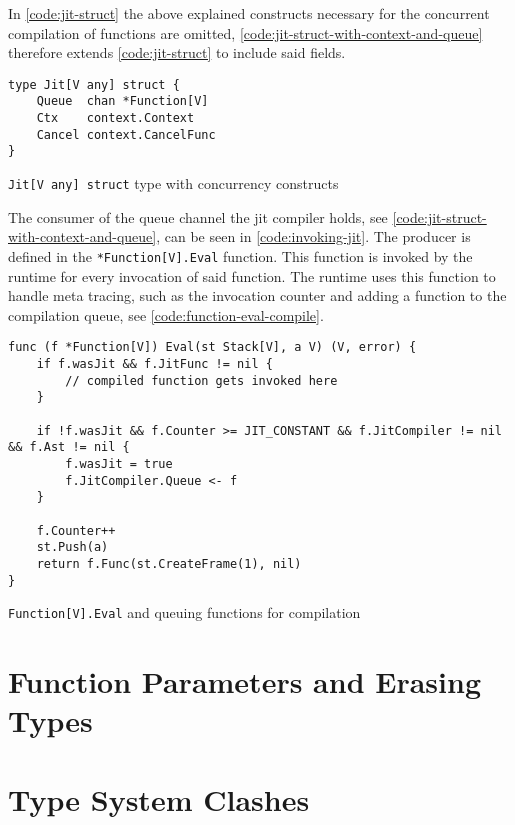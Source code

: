 In \autoref{code:jit-struct} the above explained constructs necessary for the
concurrent compilation of functions are omitted,
\autoref{code:jit-struct-with-context-and-queue} therefore extends
\autoref{code:jit-struct} to include said fields.

\begin{listing}[H]
    \begin{verbatim}
type Jit[V any] struct {
	Queue  chan *Function[V]
	Ctx    context.Context
	Cancel context.CancelFunc
}
    \end{verbatim}
    \caption{\texttt{Jit[V any] struct} type with concurrency constructs}
    \label{code:jit-struct-with-context-and-queue}
\end{listing}

The consumer of the queue channel the jit compiler holds, see
\autoref{code:jit-struct-with-context-and-queue}, can be seen in
\autoref{code:invoking-jit}. The producer is defined in the
\texttt{*Function[V].Eval} function. This function is invoked by the runtime
for every invocation of said function. The runtime uses this function to handle
meta tracing, such as the invocation counter and adding a function to the
compilation queue, see \autoref{code:function-eval-compile}.

\begin{listing}[H]
    \begin{verbatim}
func (f *Function[V]) Eval(st Stack[V], a V) (V, error) {
    if f.wasJit && f.JitFunc != nil {
        // compiled function gets invoked here
    }

    if !f.wasJit && f.Counter >= JIT_CONSTANT && f.JitCompiler != nil && f.Ast != nil {
        f.wasJit = true
        f.JitCompiler.Queue <- f
    }

    f.Counter++
    st.Push(a)
    return f.Func(st.CreateFrame(1), nil)
}

    \end{verbatim}
    \caption{\texttt{Function[V].Eval} and queuing functions for compilation}
    \label{code:function-eval-compile}
\end{listing}

\section{Function Parameters and Erasing Types}



\section{Type System Clashes}

